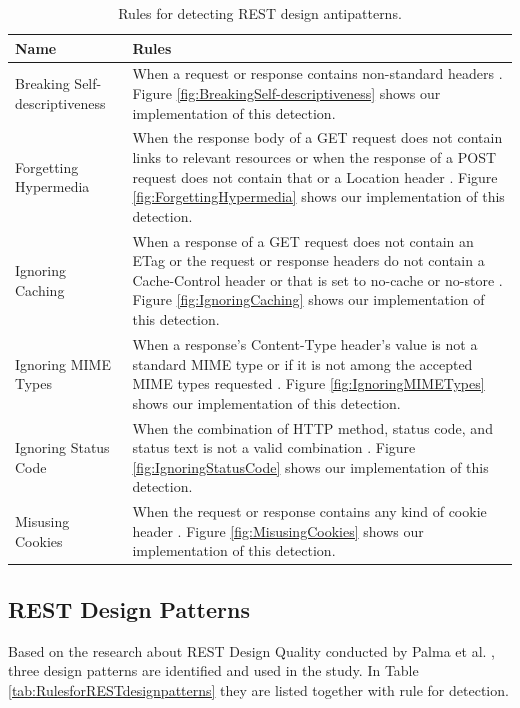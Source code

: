 \begin{table}[!ht]
\begin{center}
\small
\begin{tabular}{|p{5cm}|p{9cm}|}
\hline \textbf{Name} & \textbf{Rules} \\
\hline 
Breaking Self-descriptiveness &
When a request or response contains non-standard headers \cite{design}. Figure \ref{fig:BreakingSelf-descriptiveness} shows our implementation of this detection.


\\ \hline
Forgetting Hypermedia &
When the response body of a GET request does not contain links to relevant resources or when the response of a POST request does not contain that or a Location header \cite{design}. Figure \ref{fig:ForgettingHypermedia} shows our implementation of this detection.

\\ \hline
Ignoring Caching &
When a response of a GET request does not contain an ETag or the request or response headers do not contain a Cache-Control header or that is set to no-cache or no-store \cite{design}. Figure \ref{fig:IgnoringCaching} shows our implementation of this detection.

\\ \hline
Ignoring MIME Types &
When a response's Content-Type header's value is not a standard MIME type or if it is not among the accepted MIME types requested \cite{design}. Figure \ref{fig:IgnoringMIMETypes} shows our implementation of this detection.

\\ \hline
Ignoring Status Code &
When the combination of HTTP method, status code, and status text is not a valid combination \cite{design}. Figure \ref{fig:IgnoringStatusCode} shows our implementation of this detection.

\\ \hline
Misusing Cookies &
When the request or response contains any kind of cookie header \cite{design}. Figure \ref{fig:MisusingCookies} shows our implementation of this detection.

\\ \hline
\end{tabular}
 \caption{Rules for detecting REST design antipatterns.}
 \label{tab:RulesfordetectingRESTdesignantipatterns}
 \end{center}
\end{table}

\clearpage

\subsection{REST Design Patterns}
Based on the research about REST Design Quality conducted by Palma et al. \cite{design}, three design patterns are identified and used in the study. In Table \ref{tab:RulesforRESTdesignpatterns} they are listed together with rule for detection.

